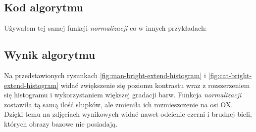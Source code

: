 \documentclass[a4paper,12pt]{book}
\begin{document}
\subsection*{Kod algorytmu}
Używałem tej samej funkcji \textit{normalizacji} co w innych przykładach: 

\subsection*{Wynik algorytmu}
Na przedstawionych rysunkach \ref{fig:man-bright-extend-histogram} i \ref{fig:cat-bright-extend-histogram} widać zwiększenie się poziomu kontrastu wraz z rozszerzeniem się histogramu i wykorzystaniem większej gradacji barw. Funkcja \textit{normalizacji} zostawiła tą samą ilość słupków, ale zmieniła ich rozmieszczenie na osi OX. Dzięki temu na zdjęciach wynikowych widać nawet odcienie czerni i brudnej bieli, których obrazy bazowe nie posiadają. 
\end{document}
